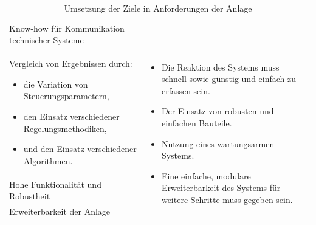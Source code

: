 \begin{table}[H]
\begin{tabularx}{1\textwidth}{m{}m{}}
\cmidrule[0.1pt](lr{2em}){1-1} 

Know-how für Kommunikation \newline technischer Systeme 	&		\\

\cmidrule[0.5pt](r{0.25em}){1-1} 
\cmidrule[0.5pt](l{0.25em}){2-2}

Vergleich von Ergebnissen durch:
\begin{minipage}[t]{0.34\textwidth}
\begin{itemize}[itemsep=0pt,topsep=1pt,leftmargin=4mm]
	\item die Variation von \newline Steuerungsparametern,
	\item den Einsatz verschiedener \newline Regelungsmethodiken,
	\item und den Einsatz \newline verschiedener Algorithmen.
\end{itemize}
\end{minipage}

& \multirow{3}{\hsize}{
\begin{minipage}[t]{0.57\textwidth}
\begin{itemize}[itemsep=0pt,topsep=0pt,leftmargin=5mm]
\item Die Reaktion des Systems muss schnell sowie günstig und einfach zu erfassen sein.
\item Der Einsatz von robusten und einfachen Bauteile.
\item Nutzung eines wartungsarmen Systems.
\item Eine einfache, modulare Erweiterbarkeit des Systems für weitere Schritte muss gegeben sein.
\end{itemize}
\end{minipage}
}  \\

\cmidrule[0.1pt](lr{2em}){1-1} 

Hohe Funktionalität und \newline Robustheit & \\

\cmidrule[0.1pt](lr{2em}){1-1} 

Erweiterbarkeit der Anlage
 &  \\

\bottomrule
\end{tabularx}
\caption{Umsetzung der Ziele in Anforderungen der Anlage}
\label{tab:anforderungen_umgebung}
\end{table}

